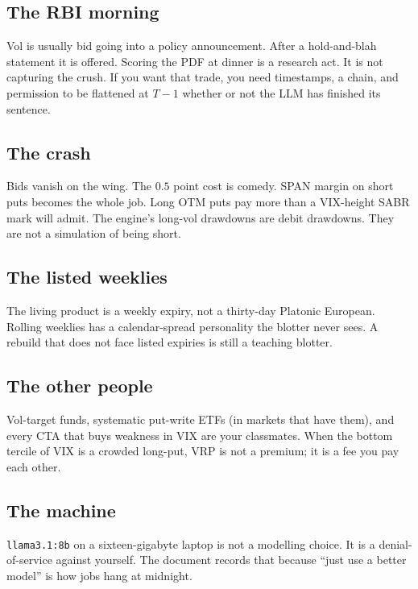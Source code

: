\documentclass[11pt,a4paper]{article}
\begin{document}
\subsection{The RBI morning}

Vol is usually bid going into a policy announcement. After a hold-and-blah statement it is offered. Scoring the PDF at dinner is a research act. It is not capturing the crush. If you want that trade, you need timestamps, a chain, and permission to be flattened at $T-1$ whether or not the LLM has finished its sentence.

\subsection{The crash}

Bids vanish on the wing. The $0.5$ point cost is comedy. SPAN margin on short puts becomes the whole job. Long OTM puts pay more than a VIX-height SABR mark will admit. The engine's long-vol drawdowns are debit drawdowns. They are not a simulation of being short.

\subsection{The listed weeklies}

The living product is a weekly expiry, not a thirty-day Platonic European. Rolling weeklies has a calendar-spread personality the blotter never sees. A rebuild that does not face listed expiries is still a teaching blotter.

\subsection{The other people}

Vol-target funds, systematic put-write ETFs (in markets that have them), and every CTA that buys weakness in VIX are your classmates. When the bottom tercile of VIX is a crowded long-put, VRP is not a premium; it is a fee you pay each other.

\subsection{The machine}

\texttt{llama3.1:8b} on a sixteen-gigabyte laptop is not a modelling choice. It is a denial-of-service against yourself. The document records that because ``just use a better model'' is how jobs hang at midnight.
\end{document}
